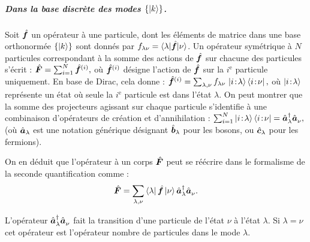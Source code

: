 \subparagraph{Dans la base discrète des modes \( \{ \ket{k} \} \).}

Soit \( \hat{\bm{f}} \) un opérateur à une particule, dont les éléments de matrice dans une base orthonormée \( \{ \ket{k} \} \) sont donnés par \( f_{\lambda\nu} = \langle \lambda \vert \hat{\bm{f}} \vert \nu \rangle \). Un opérateur symétrique à \( N \) particules correspondant à la somme des actions de \( \hat{\bm{f}} \) sur chacune des particules s’écrit :
\(
	\hat{\bm{F}} = \sum_{i=1}^N \hat{\bm{f}}^{(i)},
\)
où \( \hat{\bm{f}}^{(i)} \) désigne l’action de \( \hat{\bm{f}} \) sur la $i^\text{e}$ particule uniquement. En base de Dirac, cela donne :
\(
	\hat{\bm{f}}^{(i)} = \sum_{\lambda, \nu} f_{\lambda\nu} \, \ket{i\!:\!\lambda} \bra{i\!:\!\nu},
\)
où \( \ket{i\!:\!\lambda} \) représente un état où seule la $i^\text{e}$ particule est dans l’état \( \lambda \). %
On peut montrer que la somme des projecteurs agissant sur chaque particule s’identifie à une combinaison d’opérateurs de création et d’annihilation :
\(
	\sum_{i=1}^N \ket{i\!:\!\lambda} \bra{i\!:\!\nu} = \hat{\bm{a}}^\dagger_\lambda \hat{\bm{a}}_\nu^{},
\)
(où \( \hat{\bm{a}}_\lambda \) est une notation générique désignant \( \hat{\bm{b}}_\lambda \) pour les bosons, ou \( \hat{\bm{c}}_\lambda \) pour les fermions).

On en déduit que l’opérateur à un corps \( \hat{\bm{F}} \) peut se réécrire dans le formalisme de la seconde quantification comme :
\begin{eqnarray}\label{chap.1:eq.rapel.opp.1.prim.1}
	\hat{\bm{F}} = \sum_{\lambda, \nu} \bra{\lambda} \hat{\bm{f}} \ket{\nu} \hat{\bm{a}}^\dagger_\lambda \hat{\bm{a}}_\nu^{}.
\end{eqnarray}

L'opérateur $\hat{\bm{a}}^\dagger_\lambda \hat{\bm{a}}_\nu^{}$ fait la transition d'une particule de l'état $\nu$ à l'état $\lambda$. Si $\lambda = \nu$ cet opérateur est l'opérateur nombre de particules dans le mode $\lambda$.


